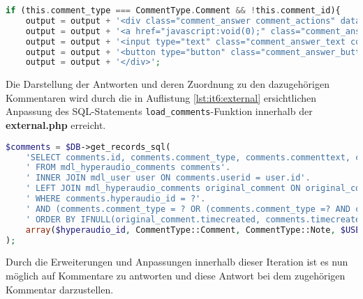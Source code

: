 \begin{lstlisting}[language=php,
             linewidth=\textwidth,
             caption={Ausschnitt der \textbf{comments.js} in der 6. Iteration},
             label={lst:it6:comments}]
if (this.comment_type === CommentType.Comment && !this.comment_id){
	output = output + '<div class="comment_answer comment_actions" data-comment_id="'+this.id+'">';
	output = output + '<a href="javascript:void(0);" class="comment_answer_link comment_link" onclick="show_answer_input(this)" data-comment_id="'+this.id+'">' + string_answer + '</a>';
	output = output + '<input type="text" class="comment_answer_text comment_hidden_element" data-comment_id="'+this.id+'"/>';
	output = output + '<button type="button" class="comment_answer_button comment_hidden_element" data-comment_id="'+this.id+'">' + string_answer + '</button>';
	output = output + '</div>';
\end{lstlisting}

Die Darstellung der Antworten und deren Zuordnung zu den dazugehörigen Kommentaren wird durch die in Auflistung \ref{lst:it6:external} ersichtlichen Anpassung des SQL-Statements \texttt{load_comments}-Funktion innerhalb der \textbf{external.php} erreicht.

\begin{lstlisting}[language=php,
             linewidth=\textwidth,
             caption={Ausschnitt der \textbf{external.php} in der 6. Iteration},
             label={lst:it6:external}]
$comments = $DB->get_records_sql(
	'SELECT comments.id, comments.comment_type, comments.commenttext, comments.timeannotated, comments.timecreated, user.username, comments.comment_id'.
	' FROM mdl_hyperaudio_comments comments'.
	' INNER JOIN mdl_user user ON comments.userid = user.id'.
	' LEFT JOIN mdl_hyperaudio_comments original_comment ON original_comment.id = comments.comment_id'.
	' WHERE comments.hyperaudio_id = ?'.
	' AND (comments.comment_type = ? OR (comments.comment_type =? AND comments.userid = ?))'.
	' ORDER BY IFNULL(original_comment.timecreated, comments.timecreated)*POWER(10, 11) + comments.timecreated',
	array($hyperaudio_id, CommentType::Comment, CommentType::Note, $USER->id)
);
\end{lstlisting}

Durch die Erweiterungen und Anpassungen innerhalb dieser Iteration ist es nun möglich auf Kommentare zu antworten und diese Antwort bei dem zugehörigen Kommentar darzustellen.


